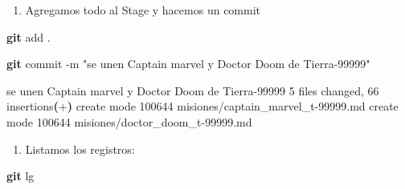 \documentclass[
]{book}
\newenvironment{Shaded}{\begin{snugshade}}{\end{snugshade}}
\newcommand{\AttributeTok}[1]{\textcolor[rgb]{0.13,0.29,0.53}{#1}}
\newcommand{\ErrorTok}[1]{\textcolor[rgb]{0.64,0.00,0.00}{\textbf{#1}}}
\newcommand{\ExtensionTok}[1]{#1}
\newcommand{\FunctionTok}[1]{\textcolor[rgb]{0.13,0.29,0.53}{\textbf{#1}}}
\newcommand{\KeywordTok}[1]{\textcolor[rgb]{0.13,0.29,0.53}{\textbf{#1}}}
\newcommand{\NormalTok}[1]{#1}
\newcommand{\StringTok}[1]{\textcolor[rgb]{0.31,0.60,0.02}{#1}}
\providecommand{\tightlist}{%
  \setlength{\itemsep}{0pt}\setlength{\parskip}{0pt}}
\begin{document}
\begin{enumerate}
\def\labelenumi{\arabic{enumi}.}
\setcounter{enumi}{3}
\tightlist
\item
  Agregamos todo al Stage y hacemos un commit
\end{enumerate}

\begin{Shaded}
\begin{Highlighting}[]
\FunctionTok{git}\NormalTok{ add .}
\end{Highlighting}
\end{Shaded}

\begin{Shaded}
\begin{Highlighting}[]
\FunctionTok{git}\NormalTok{ commit }\AttributeTok{{-}m} \StringTok{"se unen Captain marvel y Doctor Doom de Tierra{-}99999"}
\end{Highlighting}
\end{Shaded}

\begin{Shaded}
\begin{Highlighting}[]
\ExtensionTok{[tierra{-}99999}\NormalTok{ 6976c5a] se unen Captain marvel y Doctor Doom de Tierra{-}99999}
 \ExtensionTok{5}\NormalTok{ files changed, 66 insertions}\ErrorTok{(}\ExtensionTok{+}\KeywordTok{)}
 \ExtensionTok{create}\NormalTok{ mode 100644 misiones/captain\_marvel\_t{-}99999.md}
 \ExtensionTok{create}\NormalTok{ mode 100644 misiones/doctor\_doom\_t{-}99999.md}
\end{Highlighting}
\end{Shaded}

\begin{enumerate}
\def\labelenumi{\arabic{enumi}.}
\setcounter{enumi}{4}
\tightlist
\item
  Listamos los registros:
\end{enumerate}

\begin{Shaded}
\begin{Highlighting}[]
\FunctionTok{git}\NormalTok{ lg}
\end{Highlighting}
\end{Shaded}
\end{document}
